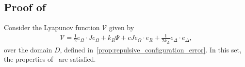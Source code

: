 \subsection{Proof of~}\label{proof:adaptive_control}
Consider the Lyapunov function \( \mathcal{V} \) given by
\begin{align*}
	\mathcal{V} = \frac{1}{2} e_\Omega \cdot J e_\Omega + k_R \Psi + c J e_\Omega \cdot e_R + \frac{1}{2 k_\Delta} e_\Delta \cdot e_\Delta , %
\end{align*}
over the domain \( D \), defined in~\cref{prop:repulsive_configuration_error}. 
In this set, the properties of~ are satisfied.

